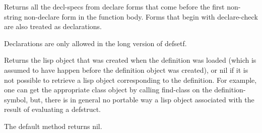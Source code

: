 \beginDefinition


\beginDocumentation
Returns all the decl-specs from \<declare\> forms that come before
the first non-string non-\<declare\> form in the function body.  Forms
that begin with \<declare-check\> are also treated as declarations.\endDocumentation
{}\endUsage
\beginArguments
{}\endArg
\endArguments
\beginReturn
\singleReturn {}\endtReturn
\endReturn

\endDefinition


\beginDefinition


\beginDocumentation
Declarations are only allowed in the long version of defsetf.\endDocumentation
{}\endUsage
\beginArguments
{}\endArg
\endArguments
\beginReturn
\singleReturn {}\endtReturn
\endReturn

\endDefinition


\beginDefinition


\beginDocumentation
Returns the lisp object that was created when the
definition was loaded (which is assumed to have happen before the
definition object was created), or nil if it is not possible to
retrieve a lisp object corresponding to the definition. For example,
one can get the appropriate class object by calling find-class on the
\<definition-symbol\>, but, there is in general no portable way a lisp
object associated with the result of evaluating a defstruct.\endDocumentation
{}\endUsage
\beginArguments
{}\endArg
\endArguments
\beginReturn
\singleReturn {}\endtReturn
\endReturn

\endDefinition


\beginDefinition


\beginDocumentation
The default method returns nil.\endDocumentation
{}\endUsage
\beginArguments
{}\endArg
\endArguments
\beginReturn
\singleReturn {}\endsReturn
\endReturn


